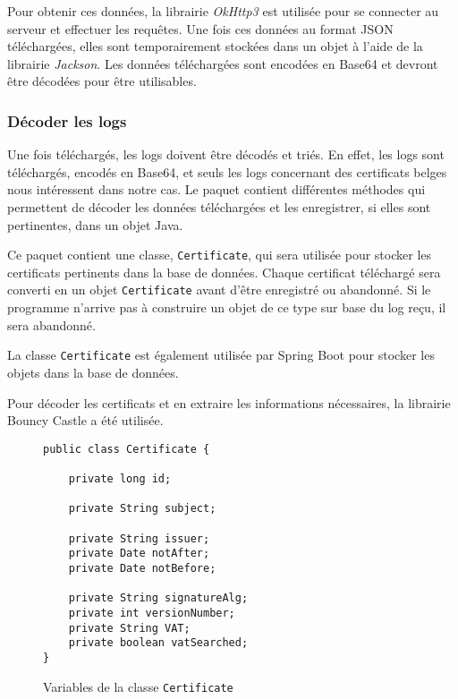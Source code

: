 \documentclass{article}
\begin{document}
Pour obtenir ces données, la librairie \emph{OkHttp3} est utilisée pour se connecter au serveur et effectuer les requêtes.  Une fois ces données au format JSON téléchargées, elles sont temporairement stockées dans un objet à l'aide de la librairie \emph{Jackson}.  Les données téléchargées sont encodées en Base64 et devront être décodées pour être utilisables.


\subsubsection{Décoder les logs}

Une fois téléchargés, les logs doivent être décodés et triés.  En effet, les logs sont téléchargés, encodés en Base64, et seuls les logs concernant des certificats belges nous intéressent dans notre cas.  Le paquet  contient différentes méthodes qui permettent de décoder les données téléchargées et les enregistrer, si elles sont pertinentes, dans un objet Java.  

Ce paquet contient une classe, \texttt{Certificate}, qui sera utilisée pour stocker les certificats pertinents dans la base de données.  Chaque certificat téléchargé sera converti en un objet \texttt{Certificate} avant d'être enregistré ou abandonné.  Si le programme n'arrive pas à construire un objet de ce type sur base du log reçu, il sera abandonné.

La classe \texttt{Certificate} est également utilisée par Spring Boot pour stocker les objets dans la base de données.

Pour décoder les certificats et en extraire les informations nécessaires, la librairie Bouncy Castle a été utilisée.

\begin{figure}[h]
\centering
\begin{verbatim}
public class Certificate {

    private long id;

    private String subject;

    private String issuer;
    private Date notAfter;
    private Date notBefore;

    private String signatureAlg;
    private int versionNumber;
    private String VAT;
    private boolean vatSearched;
}
\end{verbatim}
\caption{Variables de la classe \texttt{Certificate}}
\label{cert-fig}
\end{figure}
\end{document}
